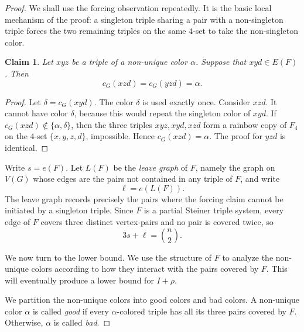 \documentclass[10pt,a4paper]{amsart}
\newtheorem{claim}{Claim}
\begin{document}
\begin{proof}
    We shall use the forcing observation repeatedly.
    It is the basic local mechanism of the proof: a singleton triple sharing a pair with a non-singleton triple forces the two remaining triples on the same $4$-set to take the non-singleton color.

    \begin{claim}\label{clm:forcing-new}
        Let $xyz$ be a triple of a non-unique color $\alpha$.  Suppose that
        $xyd\in E(F)$.  Then
        \[
            c_G(xzd)=c_G(yzd)=\alpha.
        \]
    \end{claim}

    \begin{proof}
        Let $\delta=c_G(xyd)$.  The color $\delta$ is used exactly once.
        Consider $xzd$.  It cannot have color $\delta$, because this would
        repeat the singleton color of $xyd$.  If $c_G(xzd)\notin
            \{\alpha,\delta\}$, then the three triples $xyz,xyd,xzd$ form a rainbow copy of $F_4$ on the $4$-set $\{x,y,z,d\}$, impossible.
        Hence $c_G(xzd)=\alpha$.  The proof for $yzd$ is identical.
    \end{proof}

    Write $s=e(F)$.
    Let $L(F)$ be the {\it leave graph} of $F$, namely the graph on $V(G)$ whose
    edges are the pairs not contained in any triple of $F$, and write
    \[
        \ell=e(L(F)).
    \]
    The leave graph records precisely the pairs where the forcing claim cannot be initiated by a singleton triple.
    Since $F$ is a partial Steiner triple system, every edge of $F$ covers three distinct vertex-pairs and no pair is covered twice, so
    \begin{equation}\label{eq:leave-upper-new}
        3s+\ell=\binom{n}{2}.
    \end{equation}

    We now turn to the lower bound. We use the structure of $F$ to analyze the non-unique colors according to how they interact with the pairs covered by \(F\).  This will eventually produce a lower bound for \(I+\rho\).

    We partition the non-unique colors into good colors and bad colors.
    A non-unique color $\alpha$ is called {\it good} if every $\alpha$-colored triple
    has all its three pairs covered by $F$.  Otherwise, $\alpha$ is called {\it bad}.


\end{proof}
\end{document}
